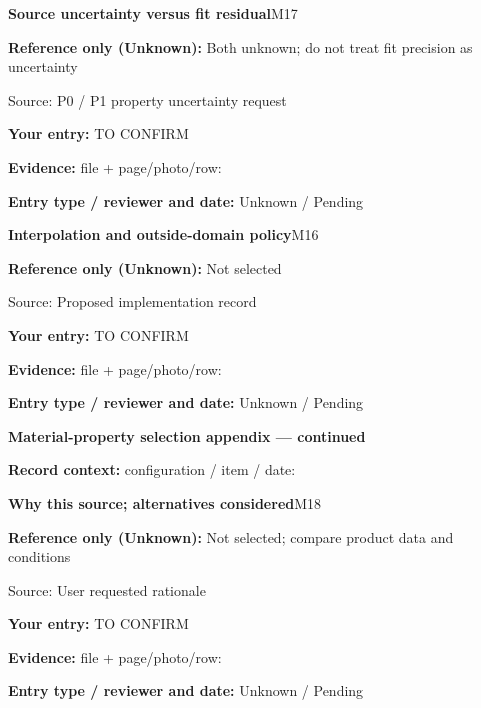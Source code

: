 \documentclass[11pt]{article}
\begin{document}
\par\noindent\begin{minipage}{\textwidth}\small
{\color{navy}\bfseries Source uncertainty versus fit residual}\hfill M17\par
\colorbox{pale}{\parbox{\dimexpr\linewidth-2\fboxsep\relax}{
\textbf{Reference only (Unknown):} Both unknown; do not treat fit precision as uncertainty\par
{\footnotesize Source: P0 / P1 property uncertainty request}}}\par
\textbf{Your entry:} {\color{muted}TO CONFIRM}\enspace\hrulefill\par
{\footnotesize\textbf{Evidence:} file + page/photo/row: \hrulefill\par
\textbf{Entry type / reviewer and date:} Unknown / Pending\par
}\end{minipage}\par\vspace{5pt}
\par\noindent\begin{minipage}{\textwidth}\small
{\color{navy}\bfseries Interpolation and outside-domain policy}\hfill M16\par
\colorbox{pale}{\parbox{\dimexpr\linewidth-2\fboxsep\relax}{
\textbf{Reference only (Unknown):} Not selected\par
{\footnotesize Source: Proposed implementation record}}}\par
\textbf{Your entry:} {\color{muted}TO CONFIRM}\enspace\hrulefill\par
{\footnotesize\textbf{Evidence:} file + page/photo/row: \hrulefill\par
\textbf{Entry type / reviewer and date:} Unknown / Pending\par
}\end{minipage}\par\vspace{5pt}
\clearpage
{\large\bfseries Material-property selection appendix --- continued}\par
\textbf{Record context:} configuration / item / date: \hrulefill\par
\par\noindent\begin{minipage}{\textwidth}\small
{\color{navy}\bfseries Why this source; alternatives considered}\hfill M18\par
\colorbox{pale}{\parbox{\dimexpr\linewidth-2\fboxsep\relax}{
\textbf{Reference only (Unknown):} Not selected; compare product data and conditions\par
{\footnotesize Source: User requested rationale}}}\par
\textbf{Your entry:} {\color{muted}TO CONFIRM}\enspace\hrulefill\par
{\footnotesize\textbf{Evidence:} file + page/photo/row: \hrulefill\par
\textbf{Entry type / reviewer and date:} Unknown / Pending\par
}\end{minipage}\par\vspace{5pt}
\end{document}
